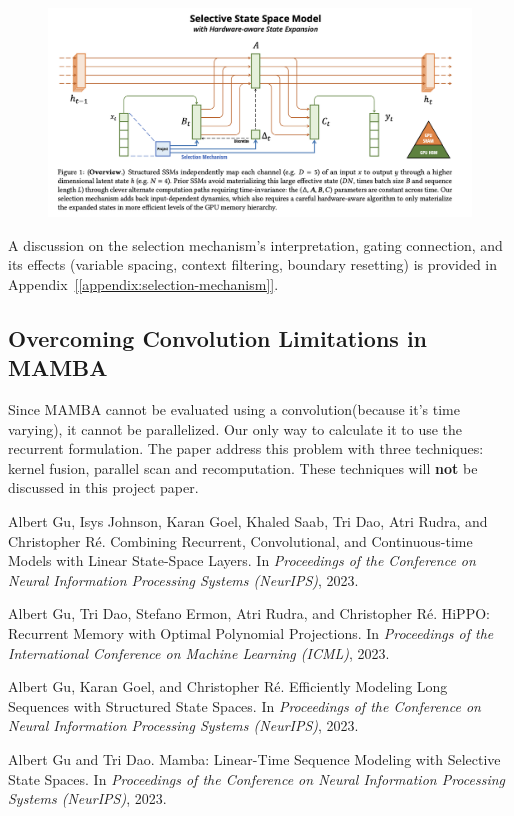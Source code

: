 \documentclass{article}
\theoremstyle{definition}
\begin{document}
\begin{figure}[H]
    \centering
    \includegraphics[width=1.0\textwidth]{image.png}
\end{figure}
A discussion on the selection mechanism's interpretation, gating connection, and its effects (variable spacing, context filtering, boundary resetting) is provided in Appendix~\hyperref[appendix:selection-mechanism]{[\ref*{appendix:selection-mechanism}]}.


\subsection{Overcoming Convolution Limitations in MAMBA}
Since MAMBA cannot be evaluated using a convolution(because it's time varying), it cannot be parallelized. Our only way to calculate it to use the recurrent formulation. The paper address this problem with three techniques: kernel fusion, parallel scan and recomputation. These techniques will \textbf{not} be discussed in this project paper.

\begin{thebibliography}{99}

Albert Gu, Isys Johnson, Karan Goel, Khaled Saab, Tri Dao, Atri Rudra, and Christopher Ré.
\newblock Combining Recurrent, Convolutional, and Continuous-time Models with Linear State-Space Layers.
\newblock In \textit{Proceedings of the Conference on Neural Information Processing Systems (NeurIPS)}, 2023.

Albert Gu, Tri Dao, Stefano Ermon, Atri Rudra, and Christopher Ré.
\newblock HiPPO: Recurrent Memory with Optimal Polynomial Projections.
\newblock In \textit{Proceedings of the International Conference on Machine Learning (ICML)}, 2023.

Albert Gu, Karan Goel, and Christopher Ré.
\newblock Efficiently Modeling Long Sequences with Structured State Spaces.
\newblock In \textit{Proceedings of the Conference on Neural Information Processing Systems (NeurIPS)}, 2023.

Albert Gu and Tri Dao.
\newblock Mamba: Linear-Time Sequence Modeling with Selective State Spaces.
\newblock In \textit{Proceedings of the Conference on Neural Information Processing Systems (NeurIPS)}, 2023.

\end{thebibliography}
\end{document}
